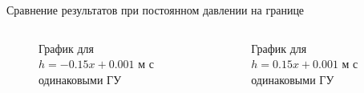 \documentclass[ignoreonframetext,unicode]{beamer}
\begin{document}
\begin{frame}{Сравнение результатов при постоянном давлении на границе}
	
	
	
	\begin{columns}
		
		
		\begin{figure}[!htbp]
			\caption{График для $h = -0.15 x + 0.001$ м с одинаковыми ГУ}
			\label{zero_neg}
		\end{figure}
		
		\begin{figure}[!htbp]
			\caption{График для $h = 0.15 x + 0.001$ м с одинаковыми ГУ}
			\label{zero_pos}
		\end{figure}
		
	\end{columns}
	
	
\end{frame}
\end{document}
